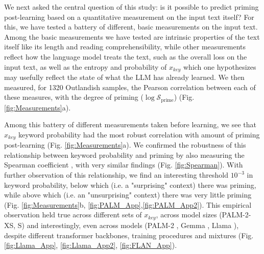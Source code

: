 \documentclass[11pt, a4paper, logo, copyright]{googledeepmind}
\theoremstyle{plain}
\theoremstyle{definition}
\theoremstyle{remark}
\begin{document}
We next asked the central question of this study: is it possible to predict priming post-learning based on a quantitative measurement on the input text itself? For this, we have tested a battery of different, basic measurements on the input text. Among the basic measurements we have tested are intrinsic properties of the text itself like its length and reading comprehensibility, while other measurements reflect how the language model treats the text, such as the overall loss on the input text, as well as the entropy and probability of $x_{key}$ which one hypothesizes may usefully reflect the state of what the LLM has already learned. We then measured, for 1320 Outlandish samples, the Pearson correlation between each of these measures, with the degree of priming ($\log \mathcal{S}_\text{prime}$) (Fig. \ref{fig:Measurements}a). 


Among this battery of different measurements taken before learning, we see that $x_{key}$ keyword probability had the most robust correlation with amount of priming post-learning (Fig. \ref{fig:Measurements}a). We confirmed the robustness of this relationship between keyword probability and priming by also measuring the Spearman coefficient \citep{spearman}, with very similar findings (Fig. \ref{fig:Spearman}). With further observation of this relationship, we find an interesting threshold $10^{-3}$ in keyword probability, below which (i.e. a "surprising" context) there was priming, while above which (i.e. an "unsurprising" context) there was very little priming (Fig. \ref{fig:Measurements}b, \ref{fig:PALM_App},\ref{fig:PALM_App2}). This empirical observation held true across different sets of $x_{key}$, across model sizes (PALM-2-XS, S) and interestingly, even across models (PALM-2 \citep{palm2}, Gemma \citep{gemma}, Llama \citep{llama}), despite different transformer backbones, training procedures and mixtures (Fig. \ref{fig:Llama_App}, \ref{fig:Llama_App2}, \ref{fig:FLAN_App}). 
\end{document}
